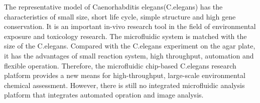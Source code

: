 \begin{englishabstract}
	The representative model of  Caenorhabditis elegans(C.elegans) has the characteristics of small size,
	short life cycle, simple structure and high gene conservation. 
	It is an important in-vivo research tool in the field of environmental exposure and toxicology research.
	The microfluidic system is matched with the size of the C.elegans. 
	Compared with the C.elegans experiment on the agar plate, 
	it has the advantages of small reaction system, high throughput, automation and flexible operation.
	Therefore, the microfluidic chip-based C.elegans research platform provides a new means for high-throughput,
	large-scale environmental chemical assessment. However, 
	there is still no integrated microfluidic analysis platform that
	integrates automated opration and image analysis.


\end{englishabstract}

